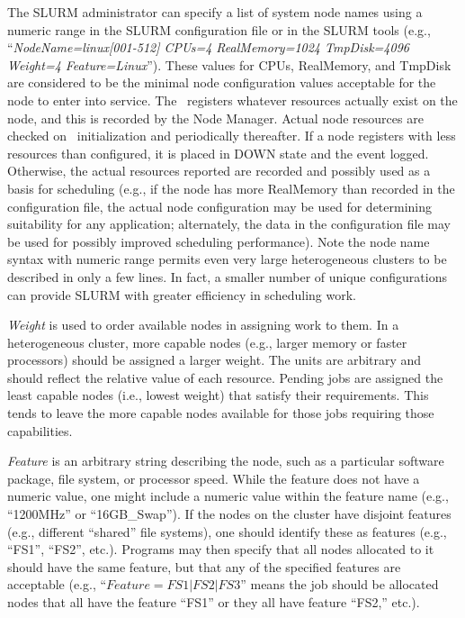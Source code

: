 \documentclass[10pt,onecolumn,times]{../common/llncs}
\begin{document}
{The SLURM administrator can specify a list of system node names using
a numeric range in the SLURM configuration file or in the SLURM tools
(e.g., ``{\em NodeName=linux[001-512] CPUs=4 RealMemory=1024 TmpDisk=4096 \linebreak
Weight=4 Feature=Linux}'').  These values for CPUs, RealMemory, and
TmpDisk are considered to be the minimal node configuration values
acceptable for the node to enter into service.  The \slurmd\ registers
whatever resources actually exist on the node, and this is recorded
by the Node Manager.  Actual node resources are checked on \slurmd\
initialization and periodically thereafter.  If a node registers with
less resources than configured, it is placed in DOWN state and
the event logged.  Otherwise, the actual resources reported are recorded
and possibly used as a basis for scheduling (e.g., if the node has more
RealMemory than recorded in the configuration file, the actual node
configuration may be used for determining suitability for any application;
alternately, the data in the configuration file may be used for possibly
improved scheduling performance).  Note the node name syntax with numeric
range permits even very large heterogeneous clusters to be described in
only a few lines.  In fact, a smaller number of unique configurations
can provide SLURM with greater efficiency in scheduling work.

{\em Weight} is used to order available nodes in assigning work to
them.  In a heterogeneous cluster, more capable nodes (e.g., larger memory
or faster processors) should be assigned a larger weight.  The units
are arbitrary and should reflect the relative value of each resource.
Pending jobs are assigned the least capable nodes (i.e., lowest weight)
that satisfy their requirements.  This tends to leave the more capable
nodes available for those jobs requiring those capabilities.

{\em Feature} is an arbitrary string describing the node, such as a
particular software package, file system, or processor speed.  While the
feature does not have a numeric value, one might include a numeric value
within the feature name (e.g., ``1200MHz'' or ``16GB\_Swap'').  If the
nodes on the cluster have disjoint features (e.g., different ``shared''
file systems), one should identify these as features (e.g., ``FS1'',
``FS2'', etc.).  Programs may then specify that all nodes allocated to
it should have the same feature, but that any of the specified features
are acceptable (e.g., ``$Feature=FS1|FS2|FS3$'' means the job should be
allocated nodes that all have the feature ``FS1'' or they all have feature
``FS2,'' etc.).

}
\end{document}
